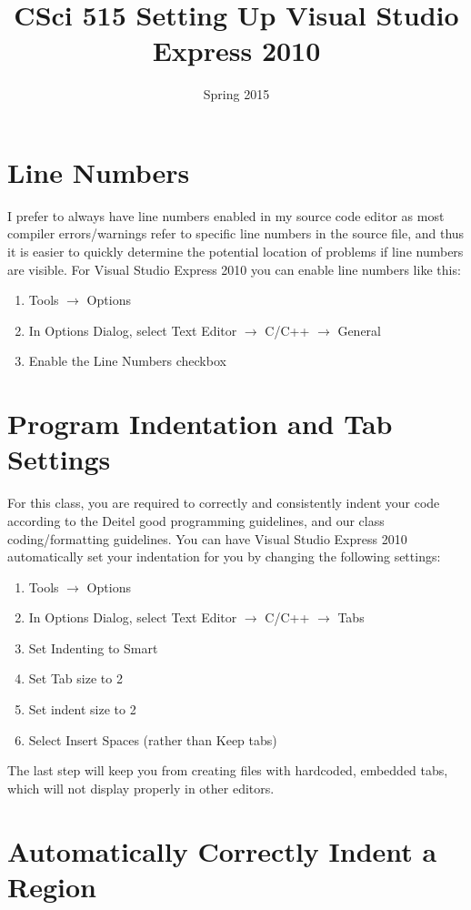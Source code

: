 \documentclass[11pt]{article}
\title{CSci 515 Setting Up Visual Studio Express 2010}
\author{}
\date{Spring 2015}
\begin{document}
\maketitle


\section{Line Numbers}
\label{sec-1}


I prefer to always have line numbers enabled in my source code editor
as most compiler errors/warnings refer to specific line numbers in the
source file, and thus it is easier to quickly determine the potential
location of problems if line numbers are visible.  For Visual Studio
Express 2010 you can enable line numbers like this:

\begin{enumerate}
\item Tools $\rightarrow$ Options
\item In Options Dialog, select Text Editor $\rightarrow$ C/C++ $\rightarrow$ General
\item Enable the Line Numbers checkbox
\end{enumerate}
\section{Program Indentation and Tab Settings}
\label{sec-2}

For this class, you are required to correctly and consistently indent your code according to the
Deitel good programming guidelines, and our class coding/formatting guidelines.  You can have
Visual Studio Express 2010 automatically set your indentation for you by changing the following
settings:

\begin{enumerate}
\item Tools $\rightarrow$ Options
\item In Options Dialog, select Text Editor $\rightarrow$ C/C++ $\rightarrow$ Tabs
\item Set Indenting to Smart
\item Set Tab size to 2
\item Set indent size to 2
\item Select Insert Spaces (rather than Keep tabs)
\end{enumerate}

The last step will keep you from creating files with hardcoded,
embedded tabs, which will not display properly in other editors.
\section{Automatically Correctly Indent a Region}
\label{sec-3}
\end{document}
